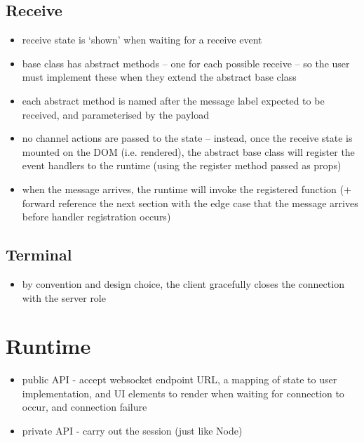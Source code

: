 \subsection{Receive}
\begin{itemize}
\item receive state is `shown' when waiting for a receive event
\item base class has abstract methods -- one for each possible receive -- so the user must implement these when they extend the abstract base class
\item each abstract method is named after the message label expected to be received, and parameterised by the payload
\item no channel actions are passed to the state -- instead, once the receive state is mounted on the DOM (i.e. rendered), the abstract base class will register the event handlers to the runtime (using the register method passed as props)
\item when the message arrives, the runtime will invoke the registered function (+ forward reference the next section with the edge case that the message arrives before handler registration occurs)
\end{itemize}

\subsection{Terminal}
\begin{itemize}
\item by convention and design choice, the client gracefully closes the connection with the server role
\end{itemize}

\section{Runtime}
\begin{itemize}
\item public API - accept websocket endpoint URL, a mapping of state to user implementation, and UI elements to render when waiting for connection to occur, and connection failure
\item private API - carry out the session (just like Node)
\end{itemize}

